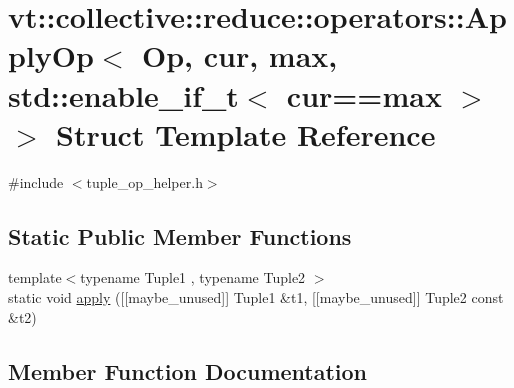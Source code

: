 \hypertarget{structvt_1_1collective_1_1reduce_1_1operators_1_1_apply_op_3_01_op_00_01cur_00_01max_00_01std_1_2d6ca6d223c0efb94ecae2d0b534fc8c}{}\section{vt\+:\+:collective\+:\+:reduce\+:\+:operators\+:\+:Apply\+Op$<$ Op, cur, max, std\+:\+:enable\+\_\+if\+\_\+t$<$ cur==max $>$ $>$ Struct Template Reference}
\label{structvt_1_1collective_1_1reduce_1_1operators_1_1_apply_op_3_01_op_00_01cur_00_01max_00_01std_1_2d6ca6d223c0efb94ecae2d0b534fc8c}


{\ttfamily \#include $<$tuple\+\_\+op\+\_\+helper.\+h$>$}

\subsection*{Static Public Member Functions}
\begin{DoxyCompactItemize}
\item 
{\footnotesize template$<$typename Tuple1 , typename Tuple2 $>$ }\\static void \hyperlink{structvt_1_1collective_1_1reduce_1_1operators_1_1_apply_op_3_01_op_00_01cur_00_01max_00_01std_1_2d6ca6d223c0efb94ecae2d0b534fc8c_a9865594b1374b8bad237a879cc4af13e}{apply} (\mbox{[}\mbox{[}maybe\+\_\+unused\mbox{]}\mbox{]} Tuple1 \&t1, \mbox{[}\mbox{[}maybe\+\_\+unused\mbox{]}\mbox{]} Tuple2 const \&t2)
\end{DoxyCompactItemize}


\subsection{Member Function Documentation}
\mbox{\label{structvt_1_1collective_1_1reduce_1_1operators_1_1_apply_op_3_01_op_00_01cur_00_01max_00_01std_1_2d6ca6d223c0efb94ecae2d0b534fc8c_a9865594b1374b8bad237a879cc4af13e}} 
